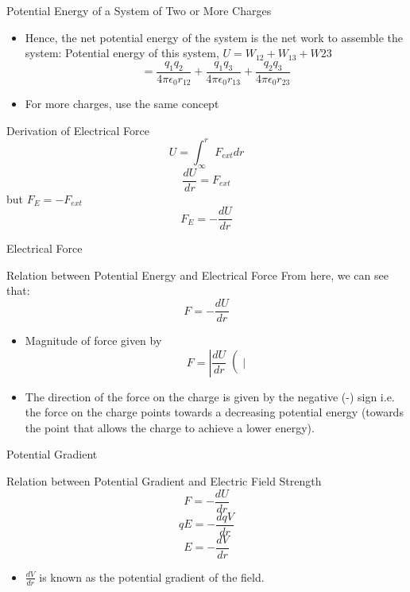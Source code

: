 \documentclass{beamer}
\begin{document}
\begin{frame}{Potential Energy of a System of Two or More Charges}{}
  \begin{itemize}
  \item Hence, the net potential energy of the system is the net work to assemble the system:
Potential energy of this system, \(U=W_{12} + W_{13} + W{23} \)
\[=\frac{q_1 q_2}{4\pi \epsilon_0 r_{12}} + \frac{q_1 q_3}{4\pi \epsilon_0 r_{13}} + \frac{q_2 q_3}{4\pi \epsilon_0 r_{23}}\]
  \item For more charges, use the same concept
  \end{itemize}
\end{frame}


\begin{frame}{Derivation of Electrical Force}{}
\[U=\int_{\infty}^r F_{ext}dr\]
\[\frac{dU}{dr}=F_{ext}\]
but \(F_E = -F_{ext}\)
\[F_E=-\frac{dU}{dr}\] 
\end{frame}

\begin{frame}{Electrical Force}{}
\begin{block}{Relation between Potential Energy and Electrical Force}
From here, we can see that:
\[F=-\frac{dU}{dr}\]
\end{block}
  \begin{itemize}
  \item Magnitude of force given by
\[F=\left|\frac{dU}{dr}\right(|\]
  \item The direction of the force on the charge is given by the negative (-) sign i.e. the force on the charge points towards a decreasing potential energy (towards the point that allows the charge to achieve a lower energy).
  \end{itemize}
\end{frame}

\begin{frame}{Potential Gradient}{}
\begin{block}{Relation between Potential Gradient and Electric Field Strength}
\[F=-\frac{dU}{dr}\]
\[qE=-\frac{dqV}{dr}\]
\[E=-\frac{dV}{dr}\]
\end{block}
  \begin{itemize}
  \item \(\frac{dV}{dr}\) is known as the potential gradient of the field.
  \end{itemize}
\end{frame}
\end{document}

